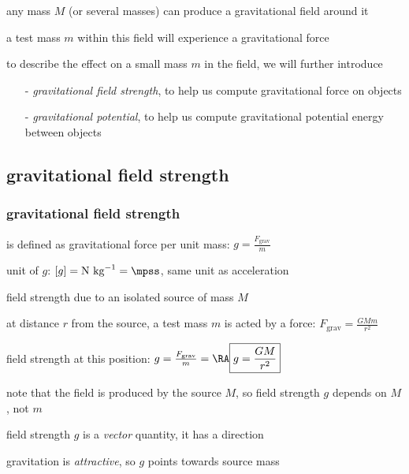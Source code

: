 any mass $M$ (or several masses) can produce a gravitational field around it

a test mass $m$ within this field will experience a gravitational force

\vspace*{\baselineskip}

to describe the effect on a small mass $m$ in the field, we will further introduce
\begin{itemize}
	\item[-] \emph{gravitational field strength}, to help us compute gravitational force on objects
	
	\item[-] \emph{gravitational potential}, to help us compute gravitational potential energy between objects
\end{itemize}


\subsection{gravitational field strength}

\subsubsection{gravitational field strength}

\rcyskip

\begin{ilight}
	 is defined as gravitational force per unit mass: $\boxed{g=\frac{F_\text{grav}}{m}}$
\end{ilight}

\cmt unit of $g$: $[g]=\text{N kg}^{-1} = \mpss$, same unit as acceleration

\cmt field strength due to an isolated source of mass $M$

at distance $r$ from the source, a test mass $m$ is acted by a force: $F_\text{grav} = \frac{GMm}{r^2}$

field strength at this position: $g = \frac{F_\text{grav}}{m} = \RA \boxed{g=\frac{GM}{r^2}}$

note that the field is produced by the source $M$, so field strength $g$ depends on $M$, not $m$

\cmt field strength $g$ is a \emph{vector} quantity, it has a direction

gravitation is \emph{attractive}, so $g$ points towards source mass

